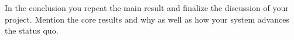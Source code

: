 \documentclass[a4paper,11pt,oneside]{report}
\begin{document}
In the conclusion you repeat the main result and finalize the discussion of
your project. Mention the core results and why as well as how your system
advances the status quo.

\cleardoublepage {} {}
\printbibliography

%
%
\end{document}
